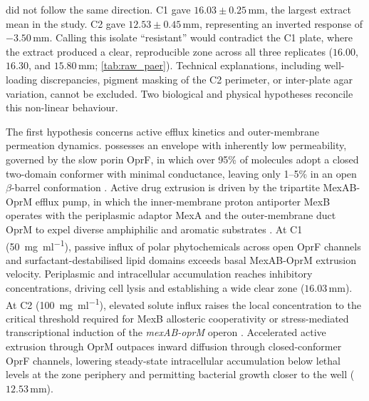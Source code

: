  did not follow the same direction. C1 gave $16.03 \pm 0.25$\,mm, the largest extract mean in the study. C2 gave $12.53 \pm 0.45$\,mm, representing an inverted response of $-3.50$\,mm. Calling this isolate ``resistant'' would contradict the C1 plate, where the extract produced a clear, reproducible zone across all three replicates ($16.00$, $16.30$, and $15.80$\,mm; \cref{tab:raw_paer}). Technical explanations, including well-loading discrepancies, pigment masking of the C2 perimeter, or inter-plate agar variation, cannot be excluded. Two biological and physical hypotheses reconcile this non-linear behaviour.

The first hypothesis concerns active efflux kinetics and outer-membrane permeation dynamics.  possesses an envelope with inherently low permeability, governed by the slow porin OprF, in which over 95\% of molecules adopt a closed two-domain conformer with minimal conductance, leaving only 1--5\% in an open $\beta$-barrel conformation \citep{chevalier2017porins}. Active drug extrusion is driven by the tripartite MexAB-OprM efflux pump, in which the inner-membrane proton antiporter MexB operates with the periplasmic adaptor MexA and the outer-membrane duct OprM to expel diverse amphiphilic and aromatic substrates \citep{li1995role,masuda2000substrate}. At C1 (\SI{50}{\milli\gram\per\milli\litre}), passive influx of polar phytochemicals across open OprF channels and surfactant-destabilised lipid domains exceeds basal MexAB-OprM extrusion velocity. Periplasmic and intracellular accumulation reaches inhibitory concentrations, driving cell lysis and establishing a wide clear zone ($16.03$\,mm). At C2 (\SI{100}{\milli\gram\per\milli\litre}), elevated solute influx raises the local concentration to the critical threshold required for MexB allosteric cooperativity or stress-mediated transcriptional induction of the \textit{mexAB-oprM} operon \citep{li1995role,poole2005efflux}. Accelerated active extrusion through OprM outpaces inward diffusion through closed-conformer OprF channels, lowering steady-state intracellular accumulation below lethal levels at the zone periphery and permitting bacterial growth closer to the well ($12.53$\,mm).

